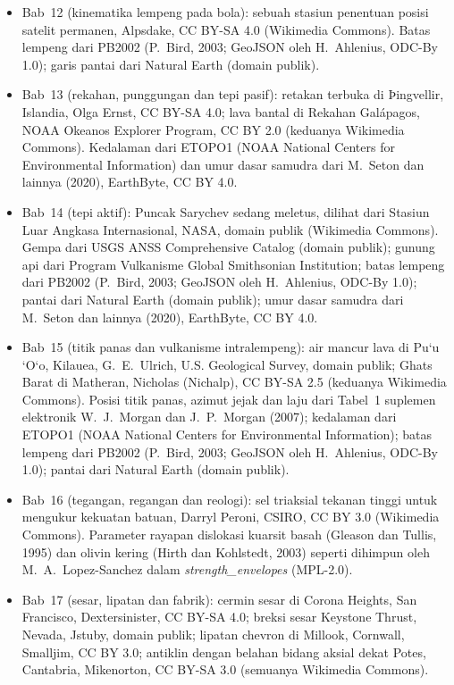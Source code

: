 \begin{itemize}
  \item Bab~12 (kinematika lempeng pada bola): sebuah stasiun penentuan posisi satelit permanen, Alpsdake, CC BY-SA 4.0 (Wikimedia Commons). Batas lempeng dari PB2002 (P.~Bird, 2003; GeoJSON oleh H.~Ahlenius, ODC-By 1.0); garis pantai dari Natural Earth (domain publik).
  \item Bab~13 (rekahan, punggungan dan tepi pasif): retakan terbuka di Þingvellir, Islandia, Olga Ernst, CC BY-SA 4.0; lava bantal di Rekahan Galápagos, NOAA Okeanos Explorer Program, CC BY 2.0 (keduanya Wikimedia Commons). Kedalaman dari ETOPO1 (NOAA National Centers for Environmental Information) dan umur dasar samudra dari M.~Seton dan lainnya (2020), EarthByte, CC BY 4.0.
  \item Bab~14 (tepi aktif): Puncak Sarychev sedang meletus, dilihat dari Stasiun Luar Angkasa Internasional, NASA, domain publik (Wikimedia Commons). Gempa dari USGS ANSS Comprehensive Catalog (domain publik); gunung api dari Program Vulkanisme Global Smithsonian Institution; batas lempeng dari PB2002 (P.~Bird, 2003; GeoJSON oleh H.~Ahlenius, ODC-By 1.0); pantai dari Natural Earth (domain publik); umur dasar samudra dari M.~Seton dan lainnya (2020), EarthByte, CC BY 4.0.
  \item Bab~15 (titik panas dan vulkanisme intralempeng): air mancur lava di Pu\textquoteleft u \textquoteleft O\textquoteleft o, Kilauea, G.~E.~Ulrich, U.S. Geological Survey, domain publik; Ghats Barat di Matheran, Nicholas (Nichalp), CC BY-SA 2.5 (keduanya Wikimedia Commons). Posisi titik panas, azimut jejak dan laju dari Tabel~1 suplemen elektronik W.~J.~Morgan dan J.~P.~Morgan (2007); kedalaman dari ETOPO1 (NOAA National Centers for Environmental Information); batas lempeng dari PB2002 (P.~Bird, 2003; GeoJSON oleh H.~Ahlenius, ODC-By 1.0); pantai dari Natural Earth (domain publik).
  \item Bab~16 (tegangan, regangan dan reologi): sel triaksial tekanan tinggi untuk mengukur kekuatan batuan, Darryl Peroni, CSIRO, CC BY 3.0 (Wikimedia Commons). Parameter rayapan dislokasi kuarsit basah (Gleason dan Tullis, 1995) dan olivin kering (Hirth dan Kohlstedt, 2003) seperti dihimpun oleh M.~A.~Lopez-Sanchez dalam \emph{strength\_envelopes} (MPL-2.0).
  \item Bab~17 (sesar, lipatan dan fabrik): cermin sesar di Corona Heights, San Francisco, Dextersinister, CC BY-SA 4.0; breksi sesar Keystone Thrust, Nevada, Jstuby, domain publik; lipatan chevron di Millook, Cornwall, Smalljim, CC BY 3.0; antiklin dengan belahan bidang aksial dekat Potes, Cantabria, Mikenorton, CC BY-SA 3.0 (semuanya Wikimedia Commons).

\end{itemize}
